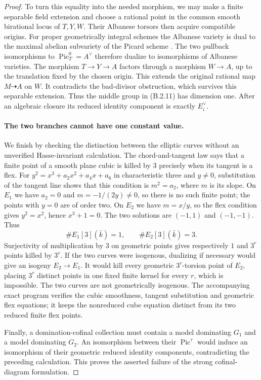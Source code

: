 \begin{proof}
To turn this equality into the needed morphism, we may make a
finite separable field extension and choose a rational point
in the common smooth birational locus of $T,Y,W$.  Their
Albanese torsors then acquire compatible origins.  For proper
geometrically integral schemes the Albanese variety is dual to
the maximal abelian subvariety of the Picard scheme
\cite[Theorem 3.2 and Remark 3.3, pp.~12--13 of the author
manuscript]{C_ACMV2026}.  The two pullback isomorphisms to
$\operatorname{Pic}^0_T=A^\vee$ therefore dualize to
isomorphisms of Albanese varieties.  The morphism
$T\to Y\to A$ factors through a morphism $W\to A$, up to
the translation fixed by the chosen origin.  This extends the
original rational map $M\dashrightarrow A$ on $W$.
It contradicts the bad-divisor obstruction, which survives
this separable extension.  Thus the middle group in (B.2.11)
has dimension one.  After an algebraic closure its reduced
identity component is exactly $E_i^\vee$.

\paragraph{The two branches cannot have one constant value.}
We finish by checking the distinction between the elliptic
curves without an unverified Hasse-invariant calculation.
The chord-and-tangent law
\cite[Chapter I, Section 3, Theorem 3.1, pp.~25--27]{MilneEC2021B}
says that a finite point of a smooth plane cubic is killed by
$3$ precisely when its tangent is a flex.  For
$y^2=x^3+a_2x^2+a_4x+a_6$ in characteristic three and $y\ne0$,
substitution of the tangent line shows that this condition is
$m^2=a_2$, where $m$ is its slope.  On $E_1$ we have
$a_2=0$ and $m=-1/(2y)\ne0$, so there is no such finite point;
the points with $y=0$ are of order two.  On $E_2$ we have
$m=x/y$, so the flex condition gives $y^2=x^2$, hence
$x^3+1=0$.  The two solutions are $(-1,1)$ and $(-1,-1)$.
Thus
\[
 \#E_1[3](\bar k)=1,\qquad \#E_2[3](\bar k)=3.
\]
Surjectivity of multiplication by $3$ on geometric points
gives respectively $1$ and $3^r$ points killed by $3^r$.
If the two curves were isogenous, dualizing if necessary would
give an isogeny $E_2\to E_1$.  It would kill every geometric
$3^r$-torsion point of $E_2$, placing $3^r$ distinct points in
one fixed finite kernel for every $r$, which is impossible.
The two curves are not geometrically isogenous.
The accompanying exact program verifies the cubic smoothness,
tangent substitution and geometric flex equations; it keeps
the nonreduced cube equation distinct from its two reduced
finite flex points.

Finally, a domination-cofinal collection must contain a model
dominating $G_1$ and a model dominating $G_2$.  An isomorphism
between their $\operatorname{Pic}^{\tau}$ would induce an
isomorphism of their geometric reduced identity components,
contradicting the preceding calculation.  This proves the
asserted failure of the strong cofinal-diagram formulation.
\end{proof}

